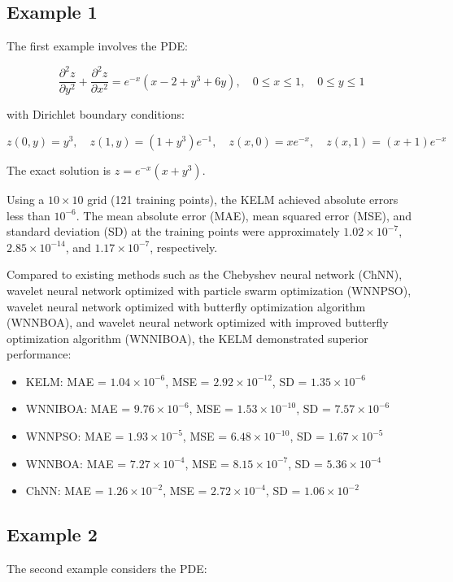 \documentclass[11pt,a4paper]{article}
\begin{document}
\subsection{Example 1}
The first example involves the PDE:

\begin{equation}
\frac{\partial^2 z}{\partial y^2} + \frac{\partial^2 z}{\partial x^2} = e^{-x}(x-2+y^3+6y), \quad 0 \leq x \leq 1, \quad 0 \leq y \leq 1
\end{equation}

with Dirichlet boundary conditions:

\begin{equation}
z(0,y) = y^3, \quad z(1,y) = (1+y^3)e^{-1}, \quad z(x,0) = xe^{-x}, \quad z(x,1) = (x+1)e^{-x}
\end{equation}

The exact solution is $z = e^{-x}(x+y^3)$.

Using a $10 \times 10$ grid (121 training points), the KELM achieved absolute errors less than $10^{-6}$. The mean absolute error (MAE), mean squared error (MSE), and standard deviation (SD) at the training points were approximately $1.02 \times 10^{-7}$, $2.85 \times 10^{-14}$, and $1.17 \times 10^{-7}$, respectively.

Compared to existing methods such as the Chebyshev neural network (ChNN), wavelet neural network optimized with particle swarm optimization (WNNPSO), wavelet neural network optimized with butterfly optimization algorithm (WNNBOA), and wavelet neural network optimized with improved butterfly optimization algorithm (WNNIBOA), the KELM demonstrated superior performance:

\begin{itemize}
    \item KELM: MAE = $1.04 \times 10^{-6}$, MSE = $2.92 \times 10^{-12}$, SD = $1.35 \times 10^{-6}$
    \item WNNIBOA: MAE = $9.76 \times 10^{-6}$, MSE = $1.53 \times 10^{-10}$, SD = $7.57 \times 10^{-6}$
    \item WNNPSO: MAE = $1.93 \times 10^{-5}$, MSE = $6.48 \times 10^{-10}$, SD = $1.67 \times 10^{-5}$
    \item WNNBOA: MAE = $7.27 \times 10^{-4}$, MSE = $8.15 \times 10^{-7}$, SD = $5.36 \times 10^{-4}$
    \item ChNN: MAE = $1.26 \times 10^{-2}$, MSE = $2.72 \times 10^{-4}$, SD = $1.06 \times 10^{-2}$
\end{itemize}

\subsection{Example 2}
The second example considers the PDE:
\end{document}
